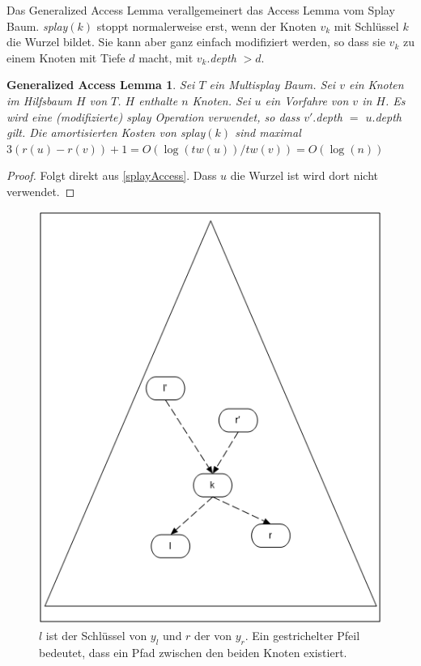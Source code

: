 \documentclass[a4paper,12pt]{article}
\begin{document}
\noindent Das Generalized Access Lemma verallgemeinert das Access Lemma vom Splay Baum. \textit{splay}$\left(k\right)$ stoppt normalerweise erst, wenn der Knoten $v_k$ mit Schlüssel $k$ die Wurzel bildet. Sie kann aber ganz einfach modifiziert werden, so dass sie $v_k$ zu einem Knoten mit Tiefe $d$ macht, mit $v_k.$\textit{depth} $> d $.

\newtheorem{Lemma1}{Generalized Access Lemma}[section] 
\begin{Lemma1}Sei $T$ ein Multisplay Baum. Sei $v$ ein Knoten im Hilfsbaum $H$ von $T$. $H$ enthalte $n$ Knoten. Sei $u$ ein Vorfahre von $v$ in $H$. Es wird eine (modifizierte) \textit{splay} Operation verwendet, so dass $v'.$\textit{depth} $=$ $u.$\textit{depth} gilt.  Die amortisierten Kosten von \textit{splay}$\left(k\right)$ sind maximal $3 \left(r\left(u\right) - r\left(v\right)\right) + 1 = O\left(\log\left(\mathit{tw}\left(u\right)\right)  / \mathit{tw}\left(v\right) \right) = O\left(\log\left(n\right)\right)$ \\	
\end{Lemma1}
\begin{proof}
Folgt direkt aus \ref{splayAccess}. Dass $u$ die Wurzel ist wird dort nicht verwendet. 	
	
\end{proof}
\begin{figure}[h]
	\centering
	\includegraphics[height= 0.7\textwidth]{"Medien/Multisplay/lemma"}
	\caption {$l$ ist der Schlüssel von $y_l$ und $r$ der von $y_r$. Ein gestrichelter Pfeil bedeutet, dass ein Pfad zwischen den beiden Knoten existiert.}
	\label{fig:lemma}
\end{figure} 
\newtheorem{Lemma2}{Multisplay Baum Access Lemma}[section] \label{lemmaMultiSplay}
\end{document}
